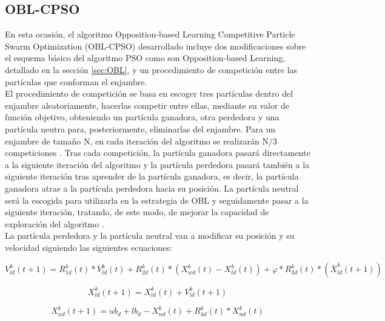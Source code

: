\subsection{OBL-CPSO}
En esta ocasión, el algoritmo Opposition-based Learning Competitive Particle Swarm Optimization (OBL-CPSO) \cite{oblcpso} desarrollado incluye dos modificaciones sobre el esquema básico del algoritmo PSO como son Opposition-based Learning, detallado en la sección \ref{sec:OBL}, y un procedimiento de competición entre las partículas que conforman el enjambre. \\

El procedimiento de competición se basa en escoger tres partículas dentro del enjambre aleatoriamente, hacerlas competir entre ellas, mediante su valor de función objetivo, obteniendo un partícula ganadora, otra perdedora y una partícula neutra para, posteriormente, eliminarlas del enjambre. Para un enjambre de tamaño N, en cada iteración del algoritmo se realizarán N/3 competiciones \cite{oblcpso}. Tras cada competición, la partícula ganadora pasará directamente a la siguiente iteración del algoritmo y la partícula perdedora pasará también a la siguiente iteración tras aprender de la partícula ganadora, es decir, la partícula ganadora atrae a la partícula perdedora hacia su posición. La partícula neutral será la escogida para utilizarla en la estrategia de OBL y seguidamente pasar a la siguiente iteración, tratando, de este modo, de mejorar la capacidad de exploración del algoritmo \cite{oblcpso}. \\

La partícula perdedora y la partícula neutral van a modificar su posición y su velocidad siguiendo las siguientes ecuaciones:

\begin{equation} \label{eq:7}
    V^{k}_{ld}(t+1) = R^{k}_{1d}(t) * V^{k}_{ld}(t) + R^{k}_{2d}(t) * (X^{k}_{wd}(t) - X^{k}_{ld}(t)) + \varphi * R^{k}_{3d}(t) * (\overline{X}^{k}_{ld}(t+1)) 
\end{equation}

\begin{equation} \label{eq:8}
     X^{k}_{ld}(t+1) = X^{k}_{ld}(t) + V^{k}_{ld}(t+1)
\end{equation}

\begin{equation} \label{eq:9}
     X^{k}_{nd}(t+1) = ub_{d} + lb_{d} - X^{k}_{nd}(t) + R^{k}_{4d}(t) * X^{k}_{nd}(t)
\end{equation}

